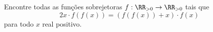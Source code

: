 Encontre todas as funções sobrejetoras $f: \RR_{> 0} \to \RR_{> 0}$ tais que
$$2x \cdot f(f(x)) = (f(f(x)) + x) \cdot f(x)$$
para todo $x$ real positivo.
